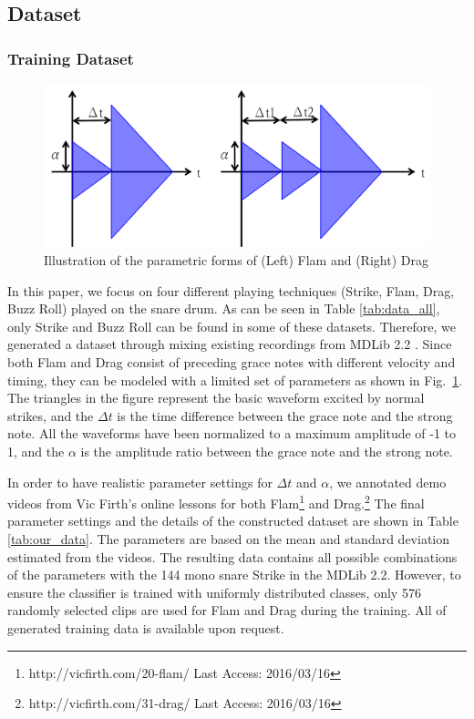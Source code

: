 \documentclass{article}
\begin{document}
\subsection{Dataset}
\subsubsection{Training Dataset}
\label{sssec:trainData}

\begin{figure} 
\centering
\includegraphics[width = 6.0 cm]{./figures/signal_model.png}
\caption{Illustration of the parametric forms of (Left) Flam and (Right) Drag}
\label{sigModel}
\end{figure}

In this paper, we focus on four different playing techniques (Strike, Flam, Drag, Buzz Roll) played on the snare drum. As can be seen in Table \ref{tab:data_all}, only Strike and Buzz Roll can be found in some of these datasets. Therefore, we generated a dataset through mixing existing recordings from MDLib 2.2 \cite{Prockup2013}. Since both Flam and Drag consist of preceding grace notes with different velocity and timing, they can be modeled with a limited set of parameters as shown in Fig.~\ref{sigModel}. The triangles in the figure represent the basic waveform excited by normal strikes, and the $\Delta t$ is the time difference between the grace note and the strong note. {\color{red}{but dt1 seems to measure the timing between gracenotes? Is the description or the figure correct?}} All the waveforms have been normalized to a maximum amplitude of -1 to 1, and the $\alpha$ is the amplitude ratio between the grace note and the strong note. 

In order to have realistic parameter settings for $\Delta t$ and $\alpha$, we annotated demo videos from Vic Firth's online lessons for both Flam\footnote{http://vicfirth.com/20-flam/ Last Access: 2016/03/16} and Drag.\footnote{http://vicfirth.com/31-drag/ Last Access: 2016/03/16} {\color{red}{Will you make this data available as well?}} The final parameter settings and the details of the constructed dataset are shown in Table \ref{tab:our_data}. The parameters are based on the mean and standard deviation estimated from the videos. The resulting data contains all possible combinations of the parameters with the 144 mono snare Strike in the MDLib 2.2. However, to ensure the classifier is trained with uniformly distributed classes, only 576 randomly selected clips are used for Flam and Drag during the training. All of generated training data is available upon request.
\end{document}
